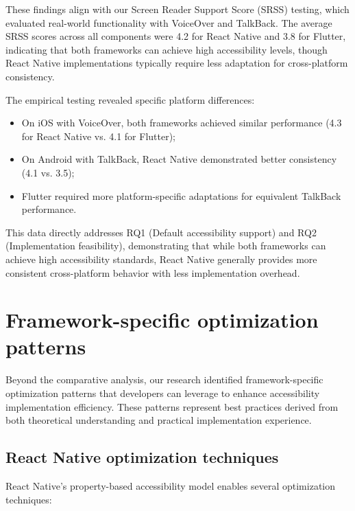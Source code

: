 These findings align with our Screen Reader Support Score (SRSS) testing, which evaluated real-world functionality with VoiceOver and TalkBack. The average SRSS scores across all components were 4.2 for React Native and 3.8 for Flutter, indicating that both frameworks can achieve high accessibility levels, though React Native implementations typically require less adaptation for cross-platform consistency.

The empirical testing revealed specific platform differences:

\begin{itemize}
    \item On iOS with VoiceOver, both frameworks achieved similar performance (4.3 for React Native vs. 4.1 for Flutter);
    \item On Android with TalkBack, React Native demonstrated better consistency (4.1 vs. 3.5);
    \item Flutter required more platform-specific adaptations for equivalent TalkBack performance.
\end{itemize}

This data directly addresses RQ1 (Default accessibility support) and RQ2 (Implementation feasibility), demonstrating that while both frameworks can achieve high accessibility standards, React Native generally provides more consistent cross-platform behavior with less implementation overhead.

\section{Framework-specific optimization patterns}
\label{sec:optimization-patterns}

Beyond the comparative analysis, our research identified framework-specific optimization patterns that developers can leverage to enhance accessibility implementation efficiency. These patterns represent best practices derived from both theoretical understanding and practical implementation experience.

\subsection{React Native optimization techniques}
\label{subsec:react-native-optimization}

React Native's property-based accessibility model enables several optimization techniques:

